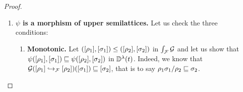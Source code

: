 \begin{proof}
\begin{enumerate}
\begin{enumerate}
\begin{enumerate}
\begin{enumerate}
      \item {\bf Proof of $\beta = \beta'$.}
        Note that:
        \[
          \begin{array}{rcll}
          \beta'
                & = & \ulbG(\ptF{\alpha'}{\cls{\redseq \sieve \tm'}})(\cls{\redseq / (\redseq \sieve \tm')}) \sqcup
                      \ulbG(\ptF{\alpha'}{\cls{\redseqtwo \sieve \tm'}})(\cls{\redseqtwo / (\redseqtwo \sieve \tm')}) \\
                & = &
                     \cls{
                       (\redseq \sieve \tm')(\redseq / (\redseq \sieve \tm'))/\alpha'
                       \sqcup
                       (\redseqtwo \sieve \tm')(\redseqtwo / (\redseqtwo \sieve \tm'))/\alpha'
                     } \\
                & = &
                     \cls{\redseq/\alpha' \sqcup \redseqtwo/\alpha'}
                     &\hspace{-5cm}\text{by \rlem{garbage_free_garbage_decomposition}} \\
                & = &
                     \cls{(\redseq \sqcup \redseqtwo)/\alpha'}
                     &\hspace{-5cm}\text{since $A/C \sqcup B/C \permeq (A \sqcup B)/C$} \\
                & = &
                     \cls{(\redseq \sqcup \redseqtwo)/((\redseq \sqcup \redseqtwo) \sieve \tm')}
                     &\hspace{-5cm}\text{since $\alpha' = \alpha = (\redseq \sqcup \redseqtwo) \sieve \tm'$} \\
                & = & \beta \\
          \end{array}
        \]
        as required. 
      \end{enumerate}
    \end{enumerate}
  \item {\bf $\psi$ is a morphism of upper semilattices.}
    Let us check the three conditions:
    \begin{enumerate}
    \item {\bf Monotonic.}
      Let $(\cls{\redseq_1},\cls{\redseqtwo_1}) \leq (\cls{\redseq_2},\cls{\redseqtwo_2})$ in $\grothy{\ulbF}{\ulbG}$
      and let us show that
      $\psi(\cls{\redseq_1},\cls{\redseqtwo_1}) \permle \psi(\cls{\redseq_2},\cls{\redseqtwo_2})$
      in $\ulbDerivLam{\tm}$.
      Indeed, we know that $\ulbG(\ptF{\cls{\redseq_2}}{\cls{\redseq_1}})(\cls{\redseqtwo_1}) \permle \cls{\redseqtwo_2}$,
      that is to say $\redseq_1\redseqtwo_1/\redseq_2 \permle \redseqtwo_2$.

\end{enumerate}
\end{enumerate}
\end{enumerate}
\end{proof}
